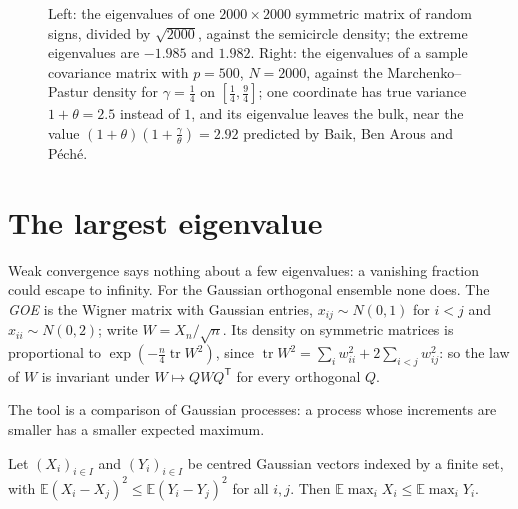 \begin{figure}[ht]
\centering
{}
\caption{Left: the eigenvalues of one $2000\times2000$ symmetric matrix of random signs, divided by $\sqrt{2000}$, against the semicircle density; the extreme eigenvalues are $-1.985$ and $1.982$. Right: the eigenvalues of a
sample covariance matrix with $p=500$, $N=2000$, against the Marchenko--Pastur density for $\gamma=\frac14$ on $[\frac14,\frac94]$; one coordinate has true variance $1+\theta=2.5$ instead of $1$, and its eigenvalue leaves the bulk, near
the value $(1+\theta)(1+\frac\gamma\theta)=2.92$ predicted by Baik, Ben Arous and P\'ech\'e.}
\label{fig:laws}
\end{figure}

\section{The largest eigenvalue}

Weak convergence says nothing about a few eigenvalues: a vanishing fraction could escape to infinity. For the Gaussian orthogonal ensemble none does. The \emph{GOE} is the Wigner matrix with Gaussian entries,
$x_{ij}\sim N(0,1)$ for $i<j$ and $x_{ii}\sim N(0,2)$; write $W=X_n/\sqrt n$. Its density on symmetric matrices is proportional to $\exp(-\frac n4\operatorname{tr}W^2)$, since $\operatorname{tr}W^2=\sum_iw_{ii}^2+2\sum_{i<j}w_{ij}^2$: so the law of
$W$ is invariant under $W\mapsto QWQ^{\mathsf T}$ for every orthogonal $Q$.

The tool is a comparison of Gaussian processes: a process whose increments are smaller has a smaller expected maximum.

\begin{lemma}\label{lem:sudakov}
Let $(X_i)_{i\in I}$ and $(Y_i)_{i\in I}$ be centred Gaussian vectors indexed by a finite set, with $\mathbb E(X_i-X_j)^2\le\mathbb E(Y_i-Y_j)^2$ for all $i,j$. Then $\mathbb E\max_iX_i\le\mathbb E\max_iY_i$.
\end{lemma}

